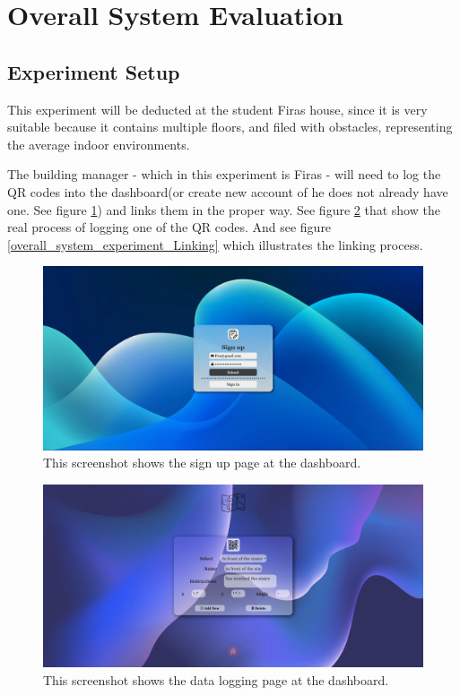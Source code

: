 \section{Overall System Evaluation}

\subsection{Experiment Setup}
This experiment will be deducted at the student Firas house, since it is very suitable because it contains multiple floors, and filed with obstacles, representing the average indoor environments.

The building manager - which in this experiment is Firas - will need to log the QR codes into the dashboard(or create new account of he does not already have one. See figure \ref{overall_system_experiment_SigUp}) and links them in the proper way. See figure \ref{overall_system_experiment_Manage} that show the real process of logging one of the QR codes. And see figure \ref{overall_system_experiment_Linking} which illustrates the linking process.

\begin{figure}[h!]
	\centering
	\includegraphics[width=0.7\linewidth]{assets/Overrall System Experiment/Sign Up.png}
	\caption{This screenshot shows the sign up page at the dashboard.}
	\label{overall_system_experiment_SigUp}
\end{figure}

\begin{figure}[h!]
	\centering
	\includegraphics[width=0.7\linewidth]{assets/Overrall System Experiment/Manage.png}
	\caption{This screenshot shows the data logging page at the dashboard.}
	\label{overall_system_experiment_Manage}
\end{figure}

